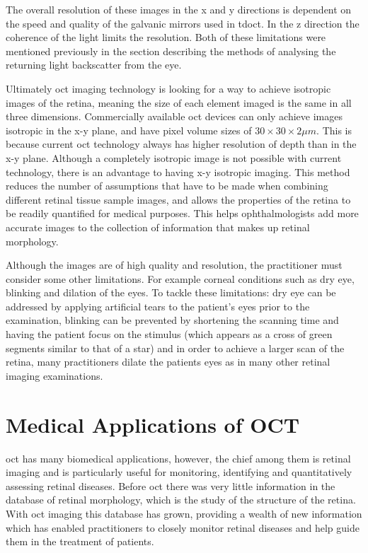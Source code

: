 The overall resolution of these images in the x and y directions is dependent on the
speed and quality of the galvanic mirrors used in \Gls{tdoct}.  In the z direction the
coherence of the light limits the resolution.  Both of these limitations were mentioned
previously in the section describing the methods of analysing the returning light
backscatter from the eye.

Ultimately \Gls{oct} imaging technology is looking for a way to achieve isotropic images
of the retina, meaning the size of each element imaged is the same in all three
dimensions.  Commercially available \Gls{oct} devices can only achieve images
isotropic in the x-y plane, and have pixel volume sizes
of $30 \times 30 \times 2\mu m$. \cite{mbib_4}
This is because current \Gls{oct} technology always has higher resolution of depth than
in the x-y plane. \cite{mbib_4}  Although a completely isotropic image is not possible
with current technology, there is an advantage to having x-y isotropic imaging.\cite{mbib_4} This method reduces the number of assumptions that 
have to be made when combining different retinal tissue sample
images, and allows the properties of the retina to be readily quantified for medical purposes.\cite{mbib_4} This helps ophthalmologists add more accurate images to the collection of information that makes up retinal morphology.

Although the images are of high quality and resolution, the practitioner must consider
some other limitations.  For example corneal conditions such as dry eye, blinking and
dilation of the eyes.  To tackle these limitations: dry eye can be addressed by applying
artificial tears to the patient's eyes prior to the examination, blinking can be prevented
by shortening the scanning time and having the patient focus on the stimulus (which appears as a cross of green segments similar to that of a star) and in order to
achieve a larger scan of the retina, many practitioners dilate the patients eyes as
in many other retinal imaging examinations.\cite{mbib_4}

\section{Medical Applications of OCT}
\Gls{oct} has many biomedical applications, however, the chief among them is retinal imaging and is particularly useful for monitoring, identifying and quantitatively
assessing retinal diseases.\cite{mbib_9,mbib_4, mbib_5}  Before \Gls{oct} there was
very little information in the database of retinal morphology, which is the study 
of the structure of the retina.  With \Gls{oct} imaging
this database has grown, providing a wealth of new information which has enabled
practitioners to closely monitor retinal diseases and help guide them in the treatment
of patients.\cite{mbib_4}

